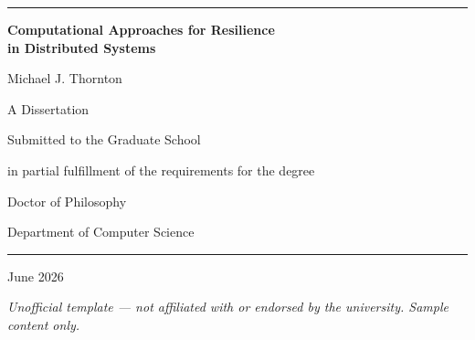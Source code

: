 \documentclass[12pt,letterpaper,oneside]{report}
\begin{document}
\begin{titlepage}
\centering
\vspace*{0pt}

{\color{nuPurple}\rule{\textwidth}{2pt}\par}
\vspace{40pt}

{\Huge\bfseries\color{nuDark}Computational Approaches for Resilience\\[8pt]
in Distributed Systems\par}

\vspace{30pt}

{\Large\color{nuGray}Michael J. Thornton\par}

\vspace{20pt}

{\large\color{nuGray}A Dissertation\par}
{\color{nuGray}Submitted to the Graduate School\par}
{\color{nuGray}in partial fulfillment of the requirements for the degree\par}

\vspace{20pt}

{\Large\color{nuDark}Doctor of Philosophy\par}

\vspace{10pt}

{\large\color{nuGray}Department of Computer Science\par}

\vspace{40pt}

{\color{nuPurple}\rule{\textwidth}{1pt}\par}
\vspace{20pt}

{\large\color{nuGray}June 2026\par}

\vfill

{\footnotesize\color{nuGray!70}\textit{Unofficial template --- not affiliated with or endorsed by the university. Sample content only.}\par}
\end{titlepage}













\end{document}
